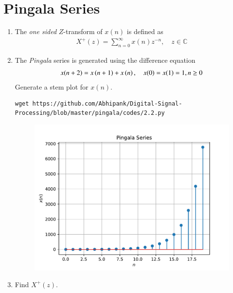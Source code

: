 \documentclass[journal,12pt,twocolumn]{IEEEtran}
\renewcommand\thesection{\arabic{section}}
\begin{document}
\section{Pingala Series}
\begin{enumerate}[label=\thesection.\arabic*,ref=\thesection.\theenumi]
\item The {\em one sided} $Z$-transform of $x(n)$ is defined as 
\begin{align}
	X^{+}(z) = \sum_{n = 0}^{\infty}x(n)z^{-n}, \quad z \in \mathbb{C}
\label{eq:one-Z}
\end{align}
	\item The {\em Pingala} series is generated using the difference equation 
\begin{align}
	x(n+2) = x\left(n+1\right) + x\left(n\right),  \quad x(0) = x(1) = 1, n \ge 0
	\label{eq:10-pingala}
\end{align}
Generate a stem plot for $x(n)$.\\
\solution
\begin{lstlisting}
wget https://github.com/Abhipank/Digital-Signal-Processing/blob/master/pingala/codes/2.2.py	
\end{lstlisting}
\begin{figure}[!ht]
	\begin{center}
	\includegraphics[width=\columnwidth]{./figs/pingalaplot.pdf}
	\end{center}
	\label{fig:xnyn}	
	\end{figure}
\item Find $X^{+}(z)$.\\
\solution
\begin{align}

\end{align}
\end{enumerate}
\end{document}

